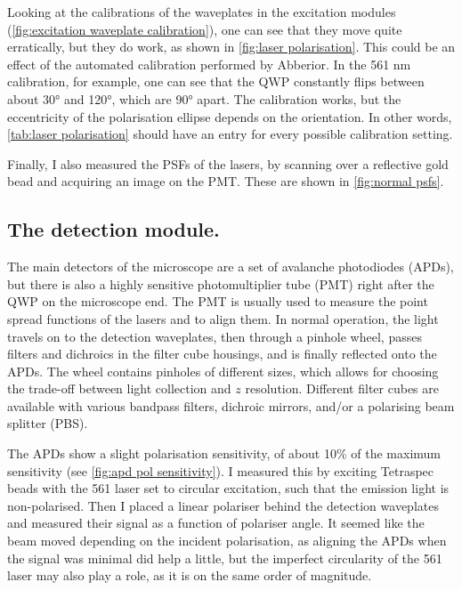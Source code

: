 Looking at the calibrations of the waveplates in the excitation modules (\autoref{fig:excitation waveplate calibration}), one can see that they move quite erratically, but they do work, as shown in \autoref{fig:laser polarisation}. This could be an effect of the automated calibration performed by Abberior. In the 561 nm calibration, for example, one can see that the QWP constantly flips between about \ang{30} and \ang{120}, which are \ang{90} apart. The calibration works, but the eccentricity of the polarisation ellipse depends on the orientation. In other words, \autoref{tab:laser polarisation} should have an entry for every possible calibration setting.

Finally, I also measured the PSFs of the lasers, by scanning over a reflective gold bead and acquiring an image on the PMT. These are shown in \autoref{fig:normal psfs}.

\subsection{The detection module.} The main detectors of the microscope are a set of avalanche photodiodes (APDs), but there is also a highly sensitive photomultiplier tube (PMT) right after the QWP on the microscope end. The PMT is usually used to measure the point spread functions of the lasers and to align them. In normal operation, the light travels on to the detection waveplates, then through a pinhole wheel, passes filters and dichroics in the filter cube housings, and is finally reflected onto the APDs. The wheel contains pinholes of different sizes, which allows for choosing the trade-off between light collection and $ z $ resolution. Different filter cubes are available with various bandpass filters, dichroic mirrors, and/or a polarising beam splitter (PBS).

The APDs show a slight polarisation sensitivity, of about 10\% of the maximum sensitivity (see \autoref{fig:apd pol sensitivity}). I measured this by exciting Tetraspec beads with the 561 laser set to circular excitation, such that the emission light is non-polarised. Then I placed a linear polariser behind the detection waveplates and measured their signal as a function of polariser angle. It seemed like the beam moved depending on the incident polarisation, as aligning the APDs when the signal was minimal did help a little, but the imperfect circularity of the 561 laser may also play a role, as it is on the same order of magnitude. 

